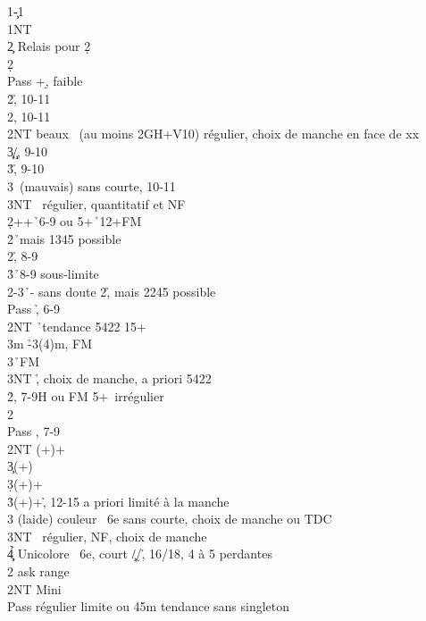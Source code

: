 \documentclass[a4paper]{article}
\begin{document}
\begin{bidtable}
1\c-1\h\\
1NT\+\\
2\c \> Relais pour 2\d \+\\
2\d\+\\
Pass +\d , faible\\
2\h {}\h , 10-11\\
2\s {}\s , 10-11\\
2NT  beaux \s\ (au moins 2GH+V10) régulier, choix de manche en face de xx\\
3\c\d {}\c /\d , 9-10\\
3\h {}\h , 9-10\\
3\s {}\s\ (mauvais) sans courte, 10-11\\
3NT \s\ régulier, quantitatif et NF\-\-\\
2\d {}++\h\ 6-9 ou 5+\h\ 12+FM\+\\
2\h {}\h\ mais 1345 possible\+\\
2\s {}\h , 8-9\\
3\h {}\h\ 8-9 sous-limite\-\\
2\s {}-3\h\ - sans doute 2\h , mais 2245 possible\+\\
Pass \h , 6-9\\
2NT \h\ tendance 5422 15+\\
3m \h -3(4)m, FM\\
3\s {}\h\ FM\\
3NT \h , choix de manche, a priori 5422\-\-\\
2\h {}\s , 7-9H ou FM 5+\s\ irrégulier\+\\
2\s\+\\
Pass \s , 7-9\\
2NT (+)+\c \\
3\c {}(+)\d \\
3\d {}(+)+\d \\
3\h {}(+)+\h , 12-15 a priori limité à la manche\\
3\s \> (laide) couleur \s\ 6e sans courte, choix de manche ou TDC\\
3NT \s\ régulier, NF, choix de manche\\
4\c\d\h \> Unicolore \s\ 6e, court \c /\d /\h , 16/18, 4 à 5 perdantes\-\-\\
2\s \> ask range\+\\
2NT \> Mini\+\\
Pass \> régulier limite ou 4\s 5m tendance sans singleton\\

\end{bidtable}
\end{document}
